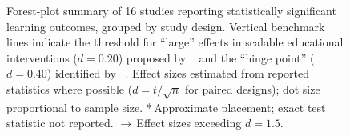 \begin{figure}[!h]
{\begin{tikzpicture}[
    every node/.style={font=\small},
    prepost/.style={fill=orange!70!black, draw=orange!70!black},
    controlled/.style={fill=blue!60!black, draw=blue!60!black},
]
\end{tikzpicture}%
}%
\caption{Forest-plot summary of 16 studies reporting statistically significant learning outcomes, grouped by study design. Vertical benchmark lines indicate the threshold for ``large'' effects in scalable educational interventions ($d = 0.20$) proposed by \citeauthor{Kraft2020}~\cite{Kraft2020} and the ``hinge point'' ($d = 0.40$) identified by \citeauthor{Hattie2009}~\cite{Hattie2009}. Effect sizes estimated from reported statistics where possible ($d = t/\sqrt{n}$ for paired designs); dot size proportional to sample size. *\,Approximate placement; exact test statistic not reported. $\rightarrow$\,Effect sizes exceeding $d = 1.5$.}
\label{fig:effect-size-forest}
\end{figure}
